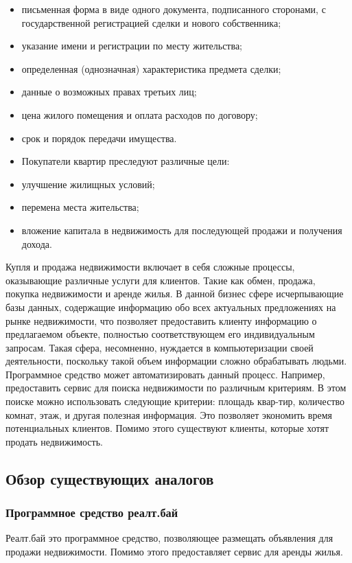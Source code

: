 \begin{itemize}
	\item письменная форма в виде одного документа, подписанного сторонами, с государственной регистрацией сделки и нового собственника;
	\item указание имени и регистрации по месту жительства;
	\item определенная (однозначная) характеристика предмета сделки;
	\item данные о возможных правах третьих лиц;
	\item цена жилого помещения и оплата расходов по договору;
	\item срок и порядок передачи имущества.
	\item Покупатели квартир преследуют различные цели:
	\item улучшение жилищных условий;
	\item перемена места жительства;
	\item вложение капитала в недвижимость для последующей продажи и получения дохода.
\end{itemize}

Купля и продажа недвижимости включает в себя сложные процессы,  оказывающие различные услуги для клиентов. Такие как обмен, продажа, покупка недвижимости и аренде жилья. В данной бизнес сфере исчерпывающие базы данных, содержащие информацию обо всех актуальных предложениях на рынке недвижимости, что позволяет предоставить клиенту информацию о предлагаемом объекте, полностью соответствующем его индивидуальным запросам. Такая сфера, несомненно, нуждается в компьютеризации своей деятельности, поскольку такой объем информации сложно обрабатывать людьми. Программное средство может автоматизировать данный процесс. Например, предоставить сервис для поиска недвижимости по различным критериям. В этом поиске можно использовать следующие критерии: площадь квар-тир, количество комнат, этаж,  и другая полезная информация. Это позволяет экономить время потенциальных клиентов. Помимо этого существуют клиенты, которые хотят продать недвижимость.


\subsection{Обзор существующих аналогов}

\subsubsection{Программное средство реалт.бай}
\label{realt.by}
Реалт.бай это программное средство, позволяющее размещать объявления для продажи недвижимости. Помимо этого предоставляет сервис для аренды жилья.

